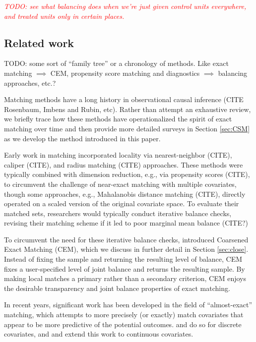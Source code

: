 \documentclass{article}
\newcommand{\note}[1]{\textcolor{red}{\textit{#1}}}
\begin{document}
\note{TODO: see what balancing does when we're just given control units everywhere, and treated units only in certain places.}


\subsection{Related work}
\label{sec:related}

TODO: some sort of ``family tree'' or a chronology of methods.
Like exact matching $\implies$ CEM, propensity score matching and diagnostics $\implies$ balancing approaches, etc.?

Matching methods have a long history in observational causal inference (CITE Rosenbaum, Imbens and Rubin, etc).
Rather than attempt an exhaustive review, we briefly trace how these methods have operationalized the spirit of exact matching over time and then provide more detailed surveys in Section \ref{sec:CSM} as we develop the method introduced in this paper.

Early work in matching incorporated locality via nearest-neighbor (CITE), caliper (CITE), and radius matching (CITE) approaches.
These methods were typically combined with dimension reduction, e.g., via propensity scores (CITE), to circumvent the challenge of near-exact matching with multiple covariates,
though some approaches, e.g., Mahalanobis distance matching (CITE), directly operated on a scaled version of the original covariate space.
To evaluate their matched sets, researchers would typically conduct iterative balance checks, revising their matching scheme if it led to poor marginal mean balance (CITE?)

To circumvent the need for these iterative balance checks, \citet{iacus2012causal} introduced Coarsened Exact Matching (CEM), which we discuss in further detail in Section \ref{sec:close}.
Instead of fixing the sample and returning the resulting level of balance, CEM fixes a user-specified level of joint balance and returns the resulting sample.
By making local matches a primary rather than a secondary criterion, CEM enjoys the desirable transparency and joint balance properties of exact matching.

In recent years, significant work has been developed in the field of ``almost-exact'' matching, which attempts to more precisely (or exactly) match covariates that appear to be more predictive of the potential outcomes.
\citet{dieng2019interpretable} and \citet{wang2021flame} do so for discrete covariates, and \citet{morucci2020adaptive} and \citet{parikh2022malts} extend this work to continuous covariates.
\end{document}
